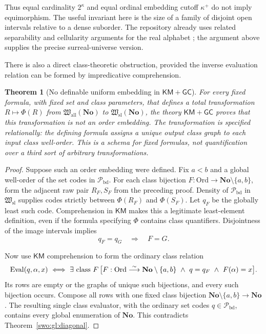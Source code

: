 \documentclass[11pt]{article}
\newtheorem{theorem}{Theorem}[section]
\theoremstyle{definition}
\theoremstyle{remark}
\newcommand{\No}{\mathbf{No}}
\newcommand{\Ord}{\mathrm{Ord}}
\newcommand{\Hsl}{\mathfrak W_{\mathrm{sl}}}
\newcommand{\Hall}{\mathfrak W_{\mathrm{all}}}
\newcommand{\Pbd}{\mathcal P_{\mathrm{bd}}}
\newcommand{\KM}{\mathsf{KM}}
\newcommand{\GC}{\mathsf{GC}}
\begin{document}
Thus equal cardinality \(2^\kappa\) and equal ordinal embedding
cutoff \(\kappa^+\) do not imply equimorphism. The useful
invariant here is the size of a family of disjoint open
intervals relative to a dense suborder. The repository already
uses related separability and cellularity arguments for the
real alphabet \cite[Remark
\texttt{lwo:sp:rem:conditional}]{ProveItReals}; the argument
above supplies the precise surreal-universe version.

There is also a direct class-theoretic obstruction, provided the
inverse evaluation relation can be formed by impredicative
comprehension.

\begin{theorem}[No definable uniform embedding in
  \(\KM+\GC\)]\label{swo:thm:km-nonembedding}
For every fixed formula, with fixed set and class parameters,
that defines a total transformation \(R\mapsto\Phi(R)\) from
\(\Hall(\No)\) to \(\Hsl(\No)\), the theory \(\KM+\GC\)
proves that this transformation is not an order embedding.
The transformation is specified relationally: the defining
formula assigns a unique output class graph to each input
class well-order. This is a schema for fixed formulas, not
quantification over a third sort of arbitrary transformations.
\end{theorem}

\begin{proof}
Suppose such an order embedding were defined. Fix \(a<b\)
and a global well-order of the set codes in \(\Pbd\).
For each class bijection
\(F:\Ord\to\No\setminus\{a,b\}\), form the adjacent raw pair
\(R_F,S_F\) from the preceding proof. Density of \(\Pbd\)
in \(\Hsl\) supplies codes strictly between
\(\Phi(R_F)\) and \(\Phi(S_F)\). Let \(q_F\) be the
globally least such code. Comprehension in \(\KM\) makes
this a legitimate least-element definition, even if the
formula specifying \(\Phi\) contains class quantifiers.
Disjointness of the image intervals implies
\[
                 q_F=q_G\quad\Longrightarrow\quad F=G.
\]

Now use \(\KM\) comprehension to form the ordinary class
relation
\[
 \operatorname{Eval}(q,\alpha,x)
 \ \Longleftrightarrow\
 \exists\hbox{ class }F\,
 \bigl[
 F:\Ord\overset{\sim}{\longrightarrow}\No\setminus\{a,b\}
 \ \wedge\ q=q_F\ \wedge\ F(\alpha)=x
 \bigr].
\]
Its rows are empty or the graphs of unique such bijections,
and every such bijection occurs. Compose all rows with one
fixed class bijection
\(\No\setminus\{a,b\}\to\No\). The resulting single
class evaluator, with the ordinary set codes \(q\in\Pbd\),
contains every global enumeration of \(\No\).
This contradicts Theorem~\ref{swo:gl:diagonal}.
\end{proof}
\end{document}
